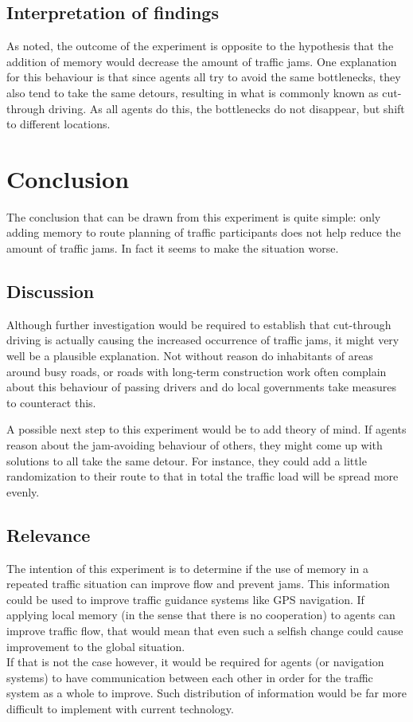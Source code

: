 \documentclass[a4paper,hidelinks]{article}
\begin{document}
\subsection{Interpretation of findings}
As noted, the outcome of the experiment is opposite to the hypothesis that the addition of memory would decrease the amount of traffic jams. One explanation for this behaviour is that since agents all try to avoid the same bottlenecks, they also tend to take the same detours, resulting in what is commonly known as cut-through driving. As all agents do this, the bottlenecks do not disappear, but shift to different locations.

\section{Conclusion}
The conclusion that can be drawn from this experiment is quite simple: only adding memory to route planning of traffic participants does not help reduce the amount of traffic jams. In fact it seems to make the situation worse.

\subsection{Discussion}
Although further investigation would be required to establish that cut-through driving is actually causing the increased occurrence of traffic jams, it might very well be a plausible explanation. Not without reason do inhabitants of areas around busy roads, or roads with long-term construction work often complain about this behaviour of passing drivers and do local governments take measures to counteract this.

A possible next step to this experiment would be to add theory of mind. If agents reason about the jam-avoiding behaviour of others, they might come up with solutions to all take the same detour. For instance, they could add a little randomization to their route to that in total the traffic load will be spread more evenly.

\subsection{Relevance}
The intention of this experiment is to determine if the use of memory in a repeated traffic situation can improve flow and prevent jams. This information could be used to improve traffic guidance systems like GPS navigation. If applying local memory (in the sense that there is no cooperation) to agents can improve traffic flow, that would mean that even such a selfish change could cause improvement to the global situation. \\
If that is not the case however, it would be required for agents (or navigation systems) to have communication between each other in order for the traffic system as a whole to improve. Such distribution of information would be far more difficult to implement with current technology.
\end{document}
